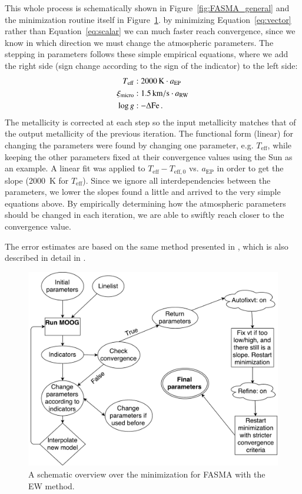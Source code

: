 \documentclass{aa}
\begin{document}
This whole process is schematically shown in Figure~\ref{fig:FASMA_general} and
the minimization routine itself in Figure~\ref{fig:FASMA_minimization}. by
minimizing Equation~\ref{eq:vector} rather than Equation~\ref{eq:scalar} we can
much faster reach convergence, since we know in which direction we must change
the atmospheric parameters. The stepping in parameters follows these simple
empirical equations, where we add the right side (sign change according to the
sign of the indicator) to the left side:
\begin{align}
    T_\mathrm{eff}     &: \SI{2000}{K} \cdot a_\mathrm{EP}   \\
    \xi_\mathrm{micro} &: \SI{1.5}{km/s} \cdot a_\mathrm{RW} \\
    \log g             &: -\Delta\ion{Fe}.
\end{align}
The metallicity is corrected at each step so the input metallicity matches that
of the output metallicity of the previous iteration. The functional form
(linear) for changing the parameters were found by changing one parameter, e.g.
$T_\mathrm{eff}$, while keeping the other parameters fixed at their convergence
values using the Sun as an example. A linear fit was applied to $T_\mathrm{eff} -
T_\mathrm{eff,0}$ vs. $a_\mathrm{EP}$ in order to get the slope (\SI{2000}{K}
for $T_\mathrm{eff}$). Since we ignore all interdependencies between the
parameters, we lower the slopes found a little and arrived to the very simple
equations above. By empirically determining how the atmospheric parameters
should be changed in each iteration, we are able to swiftly reach closer to the
convergence value.

The error estimates are based on the same method presented in
\citet{Gonzalez2000}, which is also described in detail in
\citet{Santos2003,Andreasen2016}.

\begin{figure}[tpb]
    \centering
    \includegraphics[width=1.0\linewidth,natwidth=700,natheight=650]{figures/FASMA_minimization.pdf}
    \caption{A schematic overview over the minimization for FASMA with the
    EW method.}
    \label{fig:FASMA_minimization}
\end{figure}
\end{document}
